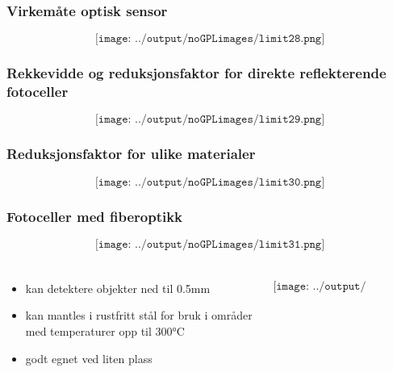 \documentclass[aspectratio=169,xcolor=dvipsnames]{beamer}
\begin{document}
\begin{frame}
	\frametitle{Virkemåte optisk sensor}
	$$\texttt{[image: ../output/noGPLimages/limit28.png]}$$
\end{frame}
\begin{frame}
	\frametitle{Rekkevidde og reduksjonsfaktor for direkte reflekterende fotoceller}
	$$\texttt{[image: ../output/noGPLimages/limit29.png]}$$
\end{frame}
\begin{frame}
	\frametitle{Reduksjonsfaktor for ulike materialer}
	$$\texttt{[image: ../output/noGPLimages/limit30.png]}$$
\end{frame}
\begin{frame}
	\frametitle{Fotoceller med fiberoptikk}
	$$\texttt{[image: ../output/noGPLimages/limit31.png]}$$
\end{frame}
\begin{frame}
	\frametitle{}
	\begin{columns}
		\begin{column}{0.5\textwidth}
			\begin{itemize}
				\item kan detektere objekter ned til 0.5mm
				\item kan mantles i rustfritt stål for bruk i områder med temperaturer opp til 300°C
				\item godt egnet ved liten plass
			\end{itemize}

			
		\end{column}

		\begin{column}{0.5\textwidth}
	$$\texttt{[image: ../output/noGPLimages/limit32.png]}$$
		\end{column}
	\end{columns}
\end{frame}
\end{document}

